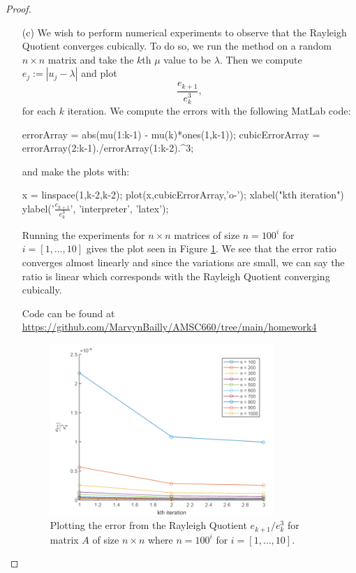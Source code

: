 \documentclass[12pt]{report}
\begin{document}
\begin{problem}
\begin{proof}
\begin{enumerate}
    \item [(c)]
    We wish to perform numerical experiments to observe that the Rayleigh Quotient converges cubically. To do so, we run the method on a random $n \times n$ matrix and take the $k$th $\mu$ value to be $\lambda$. Then we compute $e_j := |u_j - \lambda|$ and plot
    \[
         \frac{e_{k+1}}{e^3_k},
    \]
    for each $k$ iteration. We compute the errors with the following MatLab code:
    \begin{python}
    errorArray = abs(mu(1:k-1) - mu(k)*ones(1,k-1));
    cubicErrorArray = errorArray(2:k-1)./errorArray(1:k-2).^3;
    \end{python}
    and make the plots with:
    \begin{python}
    x = linspace(1,k-2,k-2);
    plot(x,cubicErrorArray,'o-');
    xlabel("kth iteration")
    ylabel('$\frac{e_{k+1}}{e_k^3}$', 'interpreter', 'latex');
    \end{python}
    Running the experiments for $n \times n$ matrices of size $n = 100^i$ for $i=[1,\dots,10]$ gives the plot seen in Figure \ref{fig1}. We see that the error ratio converges almost linearly and since the variations are small, we can say the ratio is linear which corresponds with the Rayleigh Quotient converging cubically. 
    
    Code can be found at \url{https://github.com/MarvynBailly/AMSC660/tree/main/homework4}

    \begin{figure}[H]
        \centering
        \includegraphics[width=0.8\textwidth,height=\textwidth,keepaspectratio]{lotsofplots.png}
        \caption{Plotting the error from the Rayleigh Quotient $e_{k+1}/e^3_k$ for matrix $A$ of size $n \times n$ where $n = 100^i$ for $i=[1,\dots,10]$.}
        \label{fig1}
    \end{figure}

\end{enumerate}

\end{proof}
\end{problem}
\end{document}
